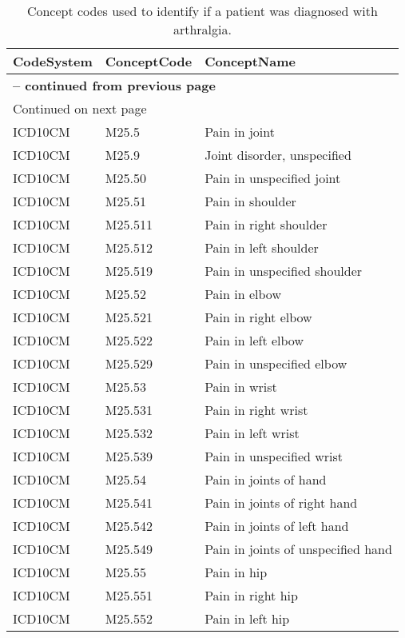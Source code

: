 \begin{longtable}{p{}p{}p{}}
\caption{Concept codes used to identify if a patient was diagnosed with arthralgia.} \\ 
 CodeSystem & ConceptCode & ConceptName \\ 
  \hline 
\endfirsthead 
\multicolumn{3}{p{\textwidth}}{{ \bfseries \tablename \thetable{} -- continued from previous page}} \ 
\hline CodeSystem & ConceptCode & ConceptName \\ \hline 
\endhead 
\hline \multicolumn{3}{p{\textwidth}}{{Continued on next page}} \\ \hline 
\endfoot 
\hline 
\endlastfoot 
 \hline
ICD10CM & M25.5 & Pain in joint \\ 
  ICD10CM & M25.9 & Joint disorder, unspecified \\ 
  ICD10CM & M25.50 & Pain in unspecified joint \\ 
  ICD10CM & M25.51 & Pain in shoulder \\ 
  ICD10CM & M25.511 & Pain in right shoulder \\ 
  ICD10CM & M25.512 & Pain in left shoulder \\ 
  ICD10CM & M25.519 & Pain in unspecified shoulder \\ 
  ICD10CM & M25.52 & Pain in elbow \\ 
  ICD10CM & M25.521 & Pain in right elbow \\ 
  ICD10CM & M25.522 & Pain in left elbow \\ 
  ICD10CM & M25.529 & Pain in unspecified elbow \\ 
  ICD10CM & M25.53 & Pain in wrist \\ 
  ICD10CM & M25.531 & Pain in right wrist \\ 
  ICD10CM & M25.532 & Pain in left wrist \\ 
  ICD10CM & M25.539 & Pain in unspecified wrist \\ 
  ICD10CM & M25.54 & Pain in joints of hand \\ 
  ICD10CM & M25.541 & Pain in joints of right hand \\ 
  ICD10CM & M25.542 & Pain in joints of left hand \\ 
  ICD10CM & M25.549 & Pain in joints of unspecified hand \\ 
  ICD10CM & M25.55 & Pain in hip \\ 
  ICD10CM & M25.551 & Pain in right hip \\ 
  ICD10CM & M25.552 & Pain in left hip \\ 

\end{longtable}
